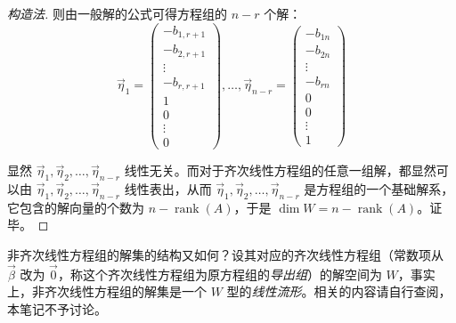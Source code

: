 \begin{proof}[构造法]
	则由一般解的公式可得方程组的 $n - r$ 个解：
	$$
	\vec \eta_1 =
	\begin{pmatrix}
		-b_{1, r + 1} \\ -b_{2, r + 1} \\ \vdots \\ -b_{r, r + 1} \\ 1 \\ 0 \\ \vdots \\ 0
	\end{pmatrix},
	\ldots,
	\vec \eta_{n - r} =
	\begin{pmatrix}
		-b_{1n} \\ -b_{2n} \\ \vdots \\ -b_{rn} \\ 0 \\ 0 \\ \vdots \\ 1
	\end{pmatrix}
	$$

	显然 $\vec \eta_1, \vec \eta_2, \ldots, \vec \eta_{n - r}$ 线性无关。而对于齐次线性方程组的任意一组解，都显然可以由 $\vec \eta_1, \vec \eta_2, \ldots, \vec \eta_{n - r}$ 线性表出，从而 $\vec \eta_1, \vec \eta_2, \ldots, \vec \eta_{n - r}$ 是方程组的一个基础解系，它包含的解向量的个数为 $n - \operatorname{rank}(A)$，于是 $\dim W = n - \operatorname{rank}(A)$。证毕。
\end{proof}

非齐次线性方程组的解集的结构又如何？设其对应的齐次线性方程组（常数项从 $\vec \beta$ 改为 $\vec 0$，称这个齐次线性方程组为原方程组的\emph{导出组}）的解空间为 $W$，事实上，非齐次线性方程组的解集是一个 $W$ 型的\emph{线性流形}。相关的内容请自行查阅，本笔记不予讨论。